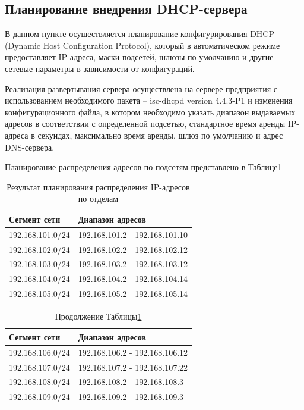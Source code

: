\subsection{Планирование внедрения DHCP-сервера}

В данном пункте осуществляется планирование конфигурирования DHCP\cite{comp-network-olipher} (Dynamic Host Configuration Protocol), который в автоматическом режиме предоставляет IP-адреса, маски подсетей, шлюзы по умолчанию и другие сетевые параметры в зависимости от конфигураций.

Реализация развертывания сервера осуществлена на сервере предприятия с использованием необходимого пакета – isc-dhcpd version 4.4.3-P1 и изменения конфигурационного файла, в котором необходимо указать диапазон выдаваемых адресов в соответствии с определенной подсетью, стандартное время аренды IP- адреса в секундах, максимально время аренды, шлюз по умолчанию и адрес DNS-сервера.

Планирование распределения адресов по подсетям представлено в Таблице\;\ref{table:dhcp_subnets}

\begin{table}[H]
\centering
{}
\caption{Результат планирования распределения IP-адресов по отделам\;\label{table:dhcp_subnets}}
\small
\begin{tabularx}{\textwidth}{|X|X|}
\hline
Сегмент сети & Диапазон адресов \\ \hline
192.168.101.0/24 & 192.168.101.2 - 192.168.101.10 \\ \hline
192.168.102.0/24 & 192.168.102.2 - 192.168.102.12 \\ \hline
192.168.103.0/24 & 192.168.103.2 - 192.168.103.12 \\ \hline
192.168.104.0/24 & 192.168.104.2 - 192.168.104.14 \\ \hline
192.168.105.0/24 & 192.168.105.2 - 192.168.105.14 \\ 
\end{tabularx}
\end{table}

\begin{table}[H]
\centering
{}
\caption{Продолжение Таблицы\;\ref{table:dhcp_subnets}}
\small
\begin{tabularx}{\textwidth}{|X|X|}
\hline
Сегмент сети & Диапазон адресов \\ \hline
192.168.106.0/24 & 192.168.106.2 - 192.168.106.12 \\ \hline
192.168.107.0/24 & 192.168.107.2 - 192.168.107.22 \\ \hline
192.168.108.0/24 & 192.168.108.2 - 192.168.108.3 \\ \hline
192.168.109.0/24 & 192.168.109.2 - 192.168.109.3 \\ \hline
\end{tabularx}
\end{table}

